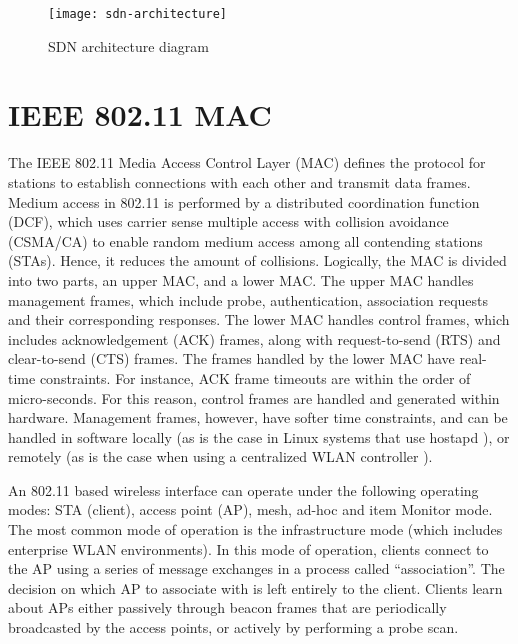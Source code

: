 \begin{figure}[H]
  \centering
  \texttt{[image: sdn-architecture]}
  \caption{SDN architecture diagram\cite{SDN:architecture}}
  \label{fig:sdn-architecture}
\end{figure}

\section{IEEE 802.11 MAC \cite{ieee2012802}}\label{sec:IEEE802.11}

The IEEE 802.11 Media Access Control Layer (MAC) \cite{ieee2012802} defines the protocol for stations
to establish connections with each other and transmit data frames.
Medium access in 802.11 is performed by a distributed coordination function (DCF), which uses carrier sense multiple access with collision avoidance (CSMA/CA) to enable random medium access among all contending stations (STAs). Hence, it reduces the amount of collisions. Logically, the MAC is divided into two parts, an upper MAC, and a lower MAC. The upper MAC handles management frames, which include probe, authentication, association requests and their corresponding responses. The lower MAC handles control frames, which includes acknowledgement (ACK) frames, along with request-to-send (RTS) and clear-to-send (CTS) frames. The frames handled by the lower MAC have real-time constraints. For instance, ACK frame timeouts are within the order of micro-seconds. For this reason, control frames are handled and generated within hardware. Management frames, however, have softer time constraints, and can be handled in software locally (as is the case in Linux systems that use hostapd \cite{hostapd}), or remotely (as is the case when using a centralized WLAN controller \cite{RFC5412L97} ).

An 802.11 based wireless interface can operate under the following operating modes: STA (client), access point (AP), mesh, ad-hoc and item Monitor mode. The most common mode of operation is the infrastructure mode (which includes enterprise WLAN environments). In this mode of operation, clients connect to the AP using a series of message exchanges in a process called “association”. The decision on which AP to associate with is left entirely to the client. Clients learn about APs either passively through beacon frames that are periodically broadcasted by the access points, or actively by performing a probe scan. 

